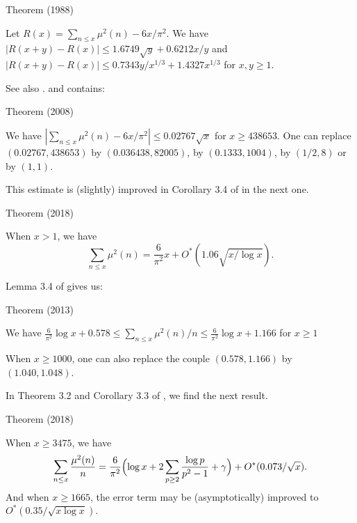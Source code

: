 \par 
\begin{thm}{Theorem (1988)}

  Let $R(x)=\sum_{n\le x}\mu^2(n)-6x/\pi^2$. We have
  $ |R(x+y)-R(x)|\le 1.6749\sqrt{y}+0.6212 x/y$ and 
  $ |R(x+y)-R(x)|\le 0.7343y/x^{1/3}+1.4327 x^{1/3}$ for $x,y\ge1$.
\end{thm}


See also \cite{CostaPereira*89}.
\cite{Moser-MacLeod*66} and 
\cite{Cohen-Dress-ElMarraki*07}
contains:
\par 
\begin{thm}{Theorem (2008)}

  We have
  $ |\sum_{n\le x}\mu^2(n)-6x/\pi^2|\le 0.02767\sqrt{x}$ for $x\ge 438653$.
  One can replace $(0.02767, 438653)$ by $(0.036438, 82005)$, by
  $(0.1333, 1004)$, by $(1/2, 8)$ or by $(1,1)$.
\end{thm}

This estimate is (slightly) improved in
Corollary 3.4 of
\cite{Ramare*18-9}
in the next one.

\par 
\begin{thm}{Theorem (2018)}

  When $x > 1$, we have
$$
\sum_{n\le x}\mu^2(n)
=\frac{6}{\pi^2}x
+O^*(1.06\sqrt{x/\log x}).
  $$
\end{thm}




\par 
Lemma 3.4
of  \cite{Ramare*13d}
gives us:
\par 
\begin{thm}{Theorem (2013)}

We have
$\frac{6}{\pi^2}\log x+0.578\le \sum_{n\le x}\mu^2(n)/n\le \frac{6}{\pi^2}\log x+1.166$ for $x\ge1$

When $x\ge1000$, one can also replace the couple $(0.578, 1.166)$ by $(1.040, 1.048)$.
\end{thm}

In Theorem 3.2 and Corollary 3.3 of
\cite{Ramare*18-9},
we find the next result.

\par 
\begin{thm}{Theorem (2018)}

  When $x \ge 3475$, we have
$$
\sum_{n\le x}\frac{\mu^2(n)}{n}
=\frac{6}{\pi^2}\Bigl(\log x+2\sum_{p\ge2}\frac{\log
p}{p^2-1}+\gamma\Bigr)
+O^*(0.073/\sqrt{x}).
  $$
  And when $x\ge 1665$, the error term may be (asymptotically) improved to
  $O^*(0.35/\sqrt{x\log x})$.
\end{thm}


